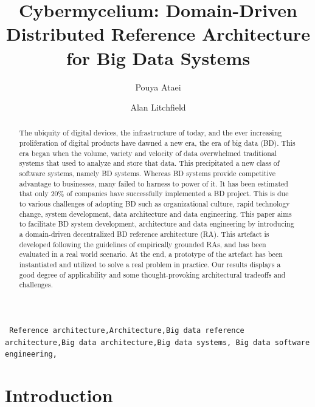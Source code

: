 \documentclass[review]{elsarticle}
\begin{document}
\begin{frontmatter}

\title{Cybermycelium: Domain-Driven Distributed Reference Architecture for Big Data Systems}

\author{Pouya Ataei}
\author{Alan Litchfield}

\address[mymainaddress]{School of Engineering, Computer and Mathematical Sciences, Auckland University of Technology, Auckland, New Zealand}


\begin{abstract}
The ubiquity of digital devices, the infrastructure of today, and the ever increasing proliferation of digital products have dawned a new era, the era of big data (BD). This era began when the volume, variety and velocity of data overwhelmed traditional systems that used to analyze and store that data. This precipitated a new class of software systems, namely BD systems. Whereas BD systems provide competitive advantage to businesses, many failed to harness to power of it. It has been estimated that only 20\% of companies have successfully implemented a BD project. This is due to various challenges of adopting BD such as organizational culture, rapid technology change, system development, data architecture and data engineering. This paper aims to facilitate BD system development, architecture and data engineering by introducing a domain-driven decentralized BD reference architecture (RA). This artefact is developed following the guidelines of empirically grounded RAs, and has been evaluated in a real world scenario. At the end, a prototype of the artefact has been instantiated and utilized to solve a real problem in practice. Our results displays a good degree of applicability and some thought-provoking architectural tradeoffs and challenges.
\end{abstract}

\begin{keyword}
\texttt{ Reference architecture\sep Architecture\sep Big data
reference architecture\sep Big data architecture\sep Big data systems\sep
Big data software engineering\sep}
\end{keyword}

\end{frontmatter}

\linenumbers

\section{Introduction}
\end{document}
